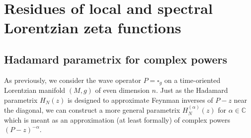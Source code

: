 \documentclass[10pt]{amsart}
\theoremstyle{definition}
\newcommand\cc{{\mathbb C}}
\let\cv\alpha
\begin{document}
\section{Residues of local and spectral Lorentzian zeta functions} \label{section5}

\subsection{Hadamard parametrix for complex powers} \label{ss:hc} As previously, we consider the wave operator $P=\square_g$ on a time-oriented Lorentzian manifold $(M,g)$ of even dimension $n$. Just as the Hadamard parametrix $H_N(z)$ is designed to approximate Feynman inverses of $P-z$ near the diagonal, we can construct a more general parametrix $H_N^{(\cv)}(z)$ for $\cv\in\cc$ which is meant as an approximation (at least formally) of complex powers $(P-z)^{-\cv}$.
\end{document}
